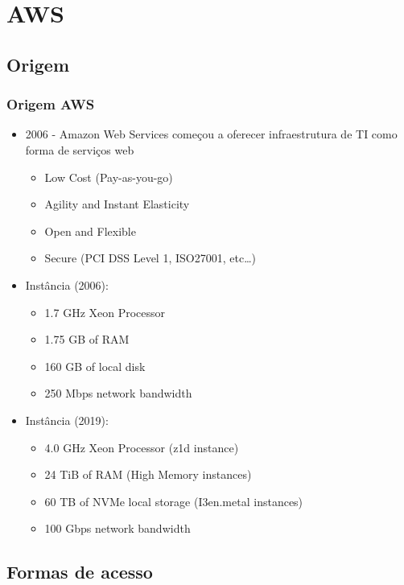 \section{AWS}

\subsection{Origem}

\begin{frame}[allowframebreaks]
	\frametitle{Origem AWS}
	\begin{itemize}
		\item 2006 - Amazon Web Services começou a oferecer infraestrutura de TI como forma de serviços web
			\begin{itemize}
				\item Low Cost (Pay-as-you-go)
				\item Agility and Instant Elasticity
				\item Open and Flexible
				\item Secure (PCI DSS Level 1, ISO27001, etc\dots)
			\end{itemize}
			\framebreak
		\item Instância (2006):
			\begin{itemize}
				\item 1.7 GHz Xeon Processor
				\item 1.75 GB of RAM
				\item 160 GB of local disk
				\item 250 Mbps network bandwidth
			\end{itemize}
		\item Instância (2019):
			\begin{itemize}
				\item 4.0 GHz Xeon Processor (z1d instance)
				\item 24 TiB of RAM (High Memory instances)
				\item 60 TB of NVMe local storage (I3en.metal instances)
				\item 100 Gbps network bandwidth
			\end{itemize}
	\end{itemize}
\end{frame}

\subsection{Formas de acesso}

